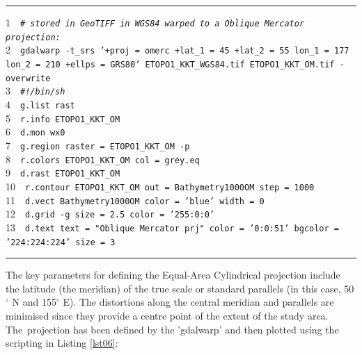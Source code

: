 \documentclass[technologies,article,accept,pdftex,moreauthors]{Definitions/mdpi}
\begin{document}
\begin{listing}[H]
\caption{GRASS GIS %
 script for plotting map in Oblique Mercator projection.}\label{lst05}
\rule{\columnwidth}{1pt}
\raggedright
1~~\texttt{\emph{\# stored in GeoTIFF in WGS84 warped to a Oblique Mercator projection:\\}}
2~~\texttt{gdalwarp -t\_srs '+proj = omerc +lat\_1 = 45 +lat\_2 = 55 lon\_1 = 177 lon\_2 = 210 +ellps = GRS80' ETOPO1\_KKT\_WGS84.tif ETOPO1\_KKT\_OM.tif -overwrite\\}
3~~\texttt{\emph{\#!/bin/sh\\}}
4~~\texttt{g.list rast\\}
5~~\texttt{r.info ETOPO1\_KKT\_OM\\}
6~~\texttt{d.mon wx0\\}
7~~\texttt{g.region raster = ETOPO1\_KKT\_OM -p\\}
8~~\texttt{r.colors ETOPO1\_KKT\_OM col = grey.eq\\}
9~~\texttt{d.rast ETOPO1\_KKT\_OM\\}
10~~\texttt{r.contour ETOPO1\_KKT\_OM out = Bathymetry1000OM step = 1000\\}
11~~\texttt{d.vect Bathymetry1000OM color = 'blue' width = 0\\}
12~~\texttt{d.grid -g size = 2.5 color = '255:0:0'\\}
13~~\texttt{d.text text = "Oblique Mercator prj" color = '0:0:51' bgcolor = '224:224:224' size = 3\\}
\rule{\columnwidth}{1pt}
\end{listing}

{The key parameters for defining the Equal-Area Cylindrical projection include the latitude (the meridian) of the true scale or standard parallels (in this case, }50$^{\circ}$ N and 155$^{\circ}$ E). {The distortions along the central meridian and parallels are minimised since they provide a centre point of the extent of the study area. The~projection has been defined by the 'gdalwarp' and then plotted using the scripting in Listing} \ref{lst06}:
\end{document}
